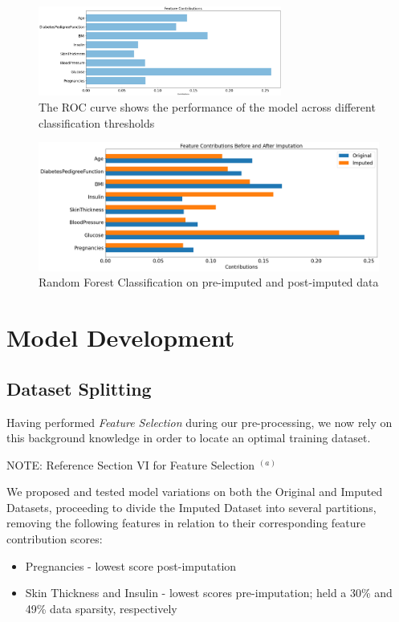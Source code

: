 \documentclass[journal]{IEEEtran}
\begin{document}
\begin{figure}
    \centering
    \includegraphics[width=8cm]{FEATURE.png}
    \caption{The ROC curve shows the performance of the model across different classification thresholds}
    \label{fig:enter-label}
\end{figure}

\begin{figure}
    \centering
    \includegraphics[width=1\linewidth]{pre_and_post-bjffoihewqorjewifewqojfoeqwiiqewjofhiwhfuewoq.png}
    \caption{Random Forest Classification on pre-imputed and post-imputed data}
    \label{fig:enter-label}
\end{figure}

\section{Model Development}

\subsection{Dataset Splitting}
Having performed \textit{Feature Selection} during our pre-processing, we now rely on this background knowledge in order to locate an optimal training dataset.
\begin{center}
NOTE: Reference Section VI for Feature Selection $^{(a)}$
\end{center}
We proposed and tested model variations on both the Original and Imputed Datasets, proceeding to divide the Imputed Dataset into several partitions, removing the following features in relation to their corresponding feature contribution scores:

\begin{itemize}
\item Pregnancies - lowest score post-imputation
\item Skin Thickness and Insulin - lowest scores pre-imputation; held a 30\% and 49\% data sparsity, respectively 
\end{itemize}
\end{document}
